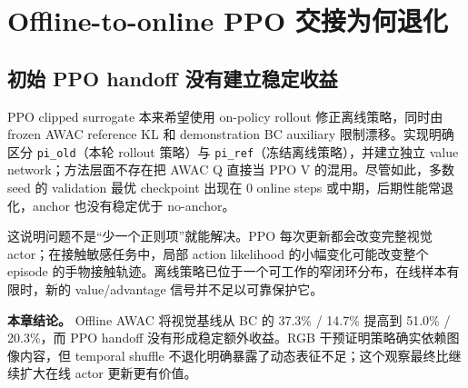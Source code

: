 \hypertarget{offline-to-online-ppo-ux4ea4ux63a5ux4e3aux4f55ux9000ux5316}{%
\section{Offline-to-online PPO 交接为何退化}\label{offline-to-online-ppo-ux4ea4ux63a5ux4e3aux4f55ux9000ux5316}}

\hypertarget{ux521dux59cb-ppo-handoff-ux6ca1ux6709ux5efaux7acbux7a33ux5b9aux6536ux76ca}{%
\subsection{初始 PPO handoff 没有建立稳定收益}\label{ux521dux59cb-ppo-handoff-ux6ca1ux6709ux5efaux7acbux7a33ux5b9aux6536ux76ca}}

PPO clipped surrogate 本来希望使用 on-policy rollout 修正离线策略，同时由 frozen AWAC reference KL 和 demonstration BC auxiliary 限制漂移。实现明确区分 \texttt{pi\_old}（本轮 rollout 策略）与 \texttt{pi\_ref}（冻结离线策略），并建立独立 value network；方法层面不存在把 AWAC Q 直接当 PPO V 的混用。尽管如此，多数 seed 的 validation 最优 checkpoint 出现在 0 online steps 或中期，后期性能常退化，anchor 也没有稳定优于 no-anchor。

这说明问题不是``少一个正则项''就能解决。PPO 每次更新都会改变完整视觉 actor；在接触敏感任务中，局部 action likelihood 的小幅变化可能改变整个 episode 的手物接触轨迹。离线策略已位于一个可工作的窄闭环分布，在线样本有限时，新的 value/advantage 信号并不足以可靠保护它。

\textbf{本章结论。} Offline AWAC 将视觉基线从 BC 的 37.3\% / 14.7\% 提高到 51.0\% / 20.3\%，而 PPO handoff 没有形成稳定额外收益。RGB 干预证明策略确实依赖图像内容，但 temporal shuffle 不退化明确暴露了动态表征不足；这个观察最终比继续扩大在线 actor 更新更有价值。

\autocite{schulman2017ppo}
